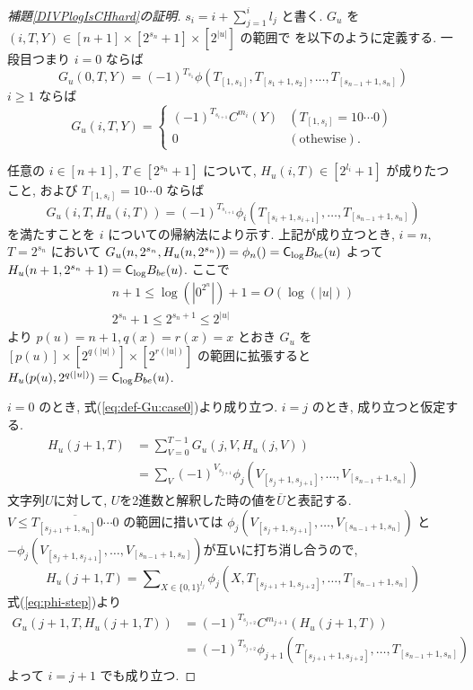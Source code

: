\begin{proof}[\textup{補題\ref{DIVPlogIsCHhard}の証明}]
 $s_i = i + \sum^i_{j=1}l_j$ と書く.
 $G_u$ を $(i, T, Y) \in [n+1] \times [2^{s_n}+1] \times [2^{|u|}]$ の範囲で
 を以下のように定義する. 一段目つまり $i=0$ ならば
 \begin{equation}
  G_u(0,T,Y) = 
   (-1)^{T_{s_1}}\phi(T_{[1,s_1]}, T_{[s_1+1,s_2]},
    \dots, T_{[s_{n-1}+1,s_n]}) 
 \end{equation}
 $i \ge 1$ ならば
 \begin{equation} \label{eq:def-Gu:case0}
  G_u(i,T,Y) = 
   \begin{cases}
    (-1)^{T_{s_{i+1}}} C^{m_i}(Y) 
    & (T_{[1,s_i]} = 10 \cdots 0) \\
    0 & (\text{othewise}).
   \end{cases} 
 \end{equation}


 任意の $i \in [n+1]$, $T \in [2^{s_n}+1]$ について,
 $H_u(i,T) \in [2^{l_i}+1]$ が成りたつこと,
 および $T_{[1,s_i]} = 10 \cdots 0$ ならば
 \begin{equation} \label{eq:subformula}
  G_u(i,T,H_u(i,T)) = (-1)^{T_{s_{i+1}}} 
   \phi_i(T_{[s_i+1, s_{i+1}]}, \dots, T_{[s_{n-1}+1, s_n]})
 \end{equation}
 を満たすことを $i$ についての帰納法により示す.
 上記が成り立つとき,
 $i=n$, $T=2^{s_n}$ において $G_u(n, 2^{s_n}, H_u(n,2^{s_n})) = \phi_n() = \mathsf{C}_{\log} B_{be}(u)$
 よって $H_u(n+1, 2^{s_n}+1) = \mathsf{C}_{\log} B_{be}(u)$.
 ここで 
 \begin{gather}
  n+1 \le \log(|0^{2^n}|) + 1 = O(\log(|u|)) \\
  2^{s_n}+1 \le 2^{s_n+1} \le 2^{|u|}
 \end{gather}
 より $p(u) = n+1, q(x) = r(x) = x$ とおき $G_u$ を
 $[p(u)] \times [2^{q(|u|)}] \times [2^{r(|u|)}]$ の範囲に拡張すると
 $H_u(p(u), 2^{q(|u|)}) = \mathsf{C}_{\log} B_{be}(u)$.

 $i=0$ のとき, 式(\ref{eq:def-Gu:case0})より成り立つ.
 $i=j$ のとき, 成り立つと仮定する.
 \begin{align}
  H_u(j+1, T) 
  &= \sum_{V = 0}^{T-1} G_u(j, V, H_u(j, V)) \\
  &= \sum_{V} (-1)^{V_{s_{j+1}}} \phi_j(V_{[s_j+1, s_{j+1}]}, 
   \dots, V_{[s_{n-1}+1, s_n]})
 \end{align}
 文字列$U$に対して, $U$を2進数と解釈した時の値を$\overline U$と表記する.
 $V \le \overline{T_{[s_{j+1}+1, s_n]} 0 \cdots 0}$ の範囲に措いては
 $\phi_j(V_{[s_j+1, s_{j+1}]}, \dots, V_{[s_{n-1}+1, s_n]})$ と
 $- \phi_j(V_{[s_j+1, s_{j+1}]}, \dots, V_{[s_{n-1}+1, s_n]})$が互いに打ち消し合うので,
 \begin{equation}
  H_u(j+1, T) = \sum\nolimits_{X \in \{0,1\}^{l_j}} 
  \phi_j(X, T_{[s_{j+1}+1, s_{j+2}]}, \dots, T_{[s_{n-1}+1, s_n]})
 \end{equation}
 式(\ref{eq:phi-step})より
 \begin{align}
  G_u(j+1,T,H_u(j+1,T)) 
  &= (-1)^{T_{s_{j+2}}} C^{m_{j+1}} (H_u(j+1, T))\\
  &= (-1)^{T_{s_{j+2}}} \phi_{j+1}(T_{[s_{j+1}+1, s_{j+2}]}, \dots, T_{[s_{n-1}+1, s_n]})
 \end{align}
 よって $i=j+1$ でも成り立つ.
 \end{proof}



